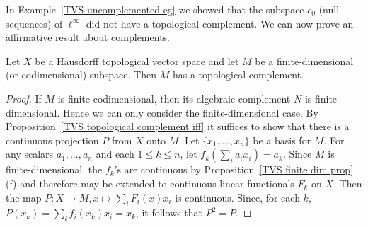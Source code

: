 In Example~\ref{TVS uncomplemented eg} we showed that the subspace $c_0$ (null sequences) of $\ell^\infty$ did not have a topological complement. We can now prove an affirmative result about complements.
\begin{proposition}
Let $X$ be a Hausdorff topological vector space and let $M$ be a finite-dimensional (or codimensional) subspace. Then $M$ has a topological complement.
\end{proposition}
\begin{proof}
If $M$ is finite-codimensional, then its algebraic complement $N$ is finite dimensional. Hence we can only consider the finite-dimensional case.   By Proposition~\ref{TVS topological complement iff} it suffices to show that there is a continuous projection $P$ from $X$ onto $M$. Let $\{x_1,\dots,x_n\}$ be a basis for $M$. For any scalars $a_1,\dots,a_n$ and each $1\leq k\leq n$, let $f_k(\sum_ia_ix_i)=a_k$. Since $M$ is finite-dimensional, the $f_k$'s are continuous by Proposition~\ref{TVS finite dim prop}(f) and therefore may be extended to continuous linear functionals $F_k$ on $X$. Then the map $P:X\to M,x\mapsto\sum_iF_i(x)x_i$ is continuous. Since, for each $k$, $P(x_k)=\sum_if_i(x_k)x_i=x_k$, it follows that $P^2=P$.
\end{proof}
